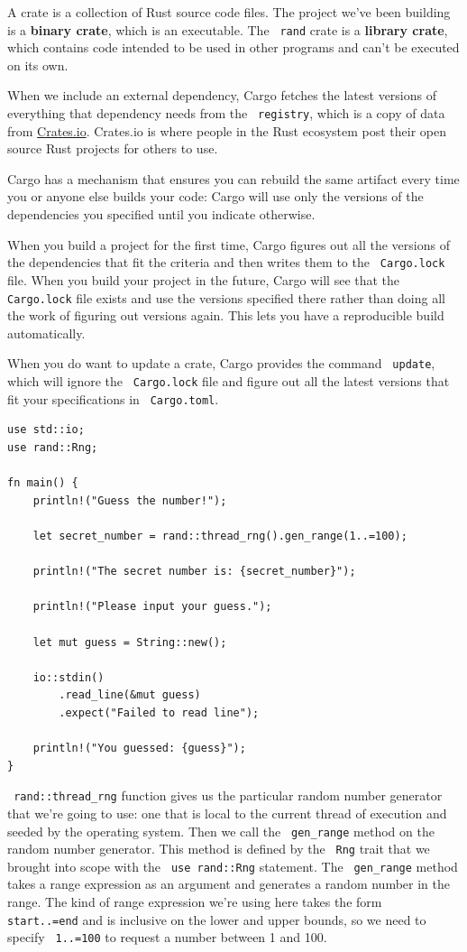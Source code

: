 \documentclass[11pt]{article}
\let\OldTexttt\texttt
\renewcommand{\texttt}[1]{\OldTexttt{\color{MidnightBlue} #1}}
\begin{document}
A crate is a collection of Rust source code files. The project we’ve been building is a \textbf{binary
crate}, which is an executable. The \texttt{rand} crate is a \textbf{library crate}, which contains code intended
to be used in other programs and can't be executed on its own.

When we include an external dependency, Cargo fetches the latest versions of everything that
dependency needs from the \texttt{registry}, which is a copy of data from \href{https://crates.io/}{Crates.io}. Crates.io is where
people in the Rust ecosystem post their open source Rust projects for others to use.

Cargo has a mechanism that ensures you can rebuild the same artifact every time you or anyone
else builds your code: Cargo will use only the versions of the dependencies you specified until
you indicate otherwise.

When you build a project for the first time, Cargo figures out all the versions of the
dependencies that fit the criteria and then writes them to the \texttt{Cargo.lock} file. When you build
your project in the future, Cargo will see that the \texttt{Cargo.lock} file exists and use the versions
specified there rather than doing all the work of figuring out versions again. This lets you
have a reproducible build automatically.

When you do want to update a crate, Cargo provides the command \texttt{update}, which will ignore the
\texttt{Cargo.lock} file and figure out all the latest versions that fit your specifications in
\texttt{Cargo.toml}.

\begin{verbatim}
use std::io;
use rand::Rng;

fn main() {
    println!("Guess the number!");

    let secret_number = rand::thread_rng().gen_range(1..=100);

    println!("The secret number is: {secret_number}");

    println!("Please input your guess.");

    let mut guess = String::new();

    io::stdin()
        .read_line(&mut guess)
        .expect("Failed to read line");

    println!("You guessed: {guess}");
}
\end{verbatim}

\texttt{rand::thread\_rng} function gives us the particular random number generator that we’re going to
use: one that is local to the current thread of execution and seeded by the operating system.
Then we call the \texttt{gen\_range} method on the random number generator. This method is defined by the
\texttt{Rng} trait that we brought into scope with the \texttt{use rand::Rng} statement. The \texttt{gen\_range} method takes
a range expression as an argument and generates a random number in the range. The kind of range
expression we’re using here takes the form \texttt{start..=end} and is inclusive on the lower and upper
bounds, so we need to specify \texttt{1..=100} to request a number between 1 and 100.
\end{document}
